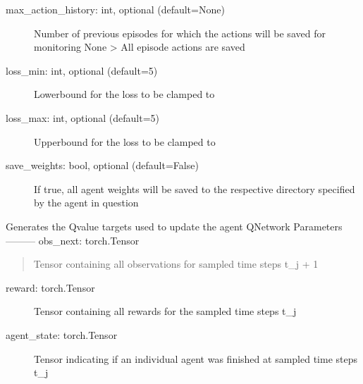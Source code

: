 \documentclass[letterpaper,10pt,english]{sphinxmanual}
\begin{document}
\begin{fulllineitems}
\begin{fulllineitems}
\begin{description}
\begin{description}
\item[{max\_action\_history: int, optional (default=None)}] \leavevmode
\sphinxAtStartPar
Number of previous episodes for which the actions will be saved for monitoring
None \textendash{}\textgreater{} All episode actions are saved

\item[{loss\_min: int, optional (default=\sphinxhyphen{}5)}] \leavevmode
\sphinxAtStartPar
Lower\sphinxhyphen{}bound for the loss to be clamped to

\item[{loss\_max: int, optional (default=5)}] \leavevmode
\sphinxAtStartPar
Upper\sphinxhyphen{}bound for the loss to be clamped to

\item[{save\_weights: bool, optional (default=False)}] \leavevmode
\sphinxAtStartPar
If true, all agent weights will be saved to the respective directory specified by the agent in question

\end{description}

\end{description}

\end{fulllineitems}


\begin{fulllineitems}
\label{\detokenize{MultiAgentMarketRL:trainer.DeepQTrainer.generate_Q_targets}}
\sphinxAtStartPar
Generates the Q\sphinxhyphen{}value targets used to update the agent QNetwork
Parameters
———\sphinxhyphen{}
obs\_next: torch.Tensor
\begin{quote}

\sphinxAtStartPar
Tensor containing all observations for sampled time steps t\_j + 1
\end{quote}
\begin{description}
\item[{reward: torch.Tensor}] \leavevmode
\sphinxAtStartPar
Tensor containing all rewards for the sampled time steps t\_j

\item[{agent\_state: torch.Tensor}] \leavevmode
\sphinxAtStartPar
Tensor indicating if an individual agent was finished at sampled time steps t\_j


\end{description}
\end{fulllineitems}
\end{fulllineitems}
\end{document}
